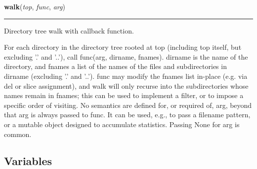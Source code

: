     \label{posixpath:walk}

    \vspace{0.5ex}

\hspace{.8\funcindent}\begin{boxedminipage}{\funcwidth}

    \raggedright \textbf{walk}(\textit{top}, \textit{func}, \textit{arg})

    \vspace{-1.5ex}

    \rule{\textwidth}{0.5\fboxrule}
\setlength{\parskip}{2ex}
    Directory tree walk with callback function.

    For each directory in the directory tree rooted at top (including top 
    itself, but excluding '.' and '..'), call func(arg, dirname, fnames). 
    dirname is the name of the directory, and fnames a list of the names of
    the files and subdirectories in dirname (excluding '.' and '..').  func
    may modify the fnames list in-place (e.g. via del or slice assignment),
    and walk will only recurse into the subdirectories whose names remain 
    in fnames; this can be used to implement a filter, or to impose a 
    specific order of visiting.  No semantics are defined for, or required 
    of, arg, beyond that arg is always passed to func.  It can be used, 
    e.g., to pass a filename pattern, or a mutable object designed to 
    accumulate statistics.  Passing None for arg is common.

\setlength{\parskip}{1ex}
    \end{boxedminipage}



  \subsection{Variables}

